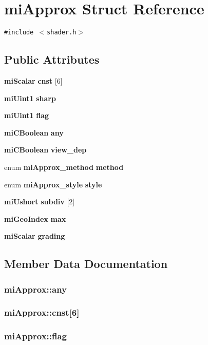 \section{mi\-Approx Struct Reference}
\label{structmiApprox}
{\tt \#include $<$shader.h$>$}

\subsection*{Public Attributes}
\begin{CompactItemize}
\item 
{\bf mi\-Scalar} {\bf cnst} [6]
\item 
{\bf mi\-Uint1} {\bf sharp}
\item 
{\bf mi\-Uint1} {\bf flag}
\item 
{\bf mi\-CBoolean} {\bf any}
\item 
{\bf mi\-CBoolean} {\bf view\_\-dep}
\item 
enum {\bf mi\-Approx\_\-method} {\bf method}
\item 
enum {\bf mi\-Approx\_\-style} {\bf style}
\item 
{\bf mi\-Ushort} {\bf subdiv} [2]
\item 
{\bf mi\-Geo\-Index} {\bf max}
\item 
{\bf mi\-Scalar} {\bf grading}
\end{CompactItemize}


\subsection{Member Data Documentation}
\subsubsection{ {\bf mi\-Approx::any}}\label{structmiApprox_o3}


\subsubsection{ {\bf mi\-Approx::cnst}[6]}\label{structmiApprox_o0}


\subsubsection{ {\bf mi\-Approx::flag}}\label{structmiApprox_o2}


